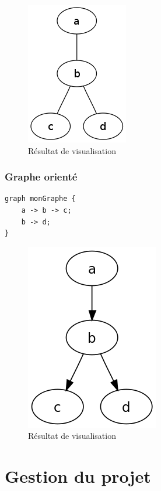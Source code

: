 \documentclass[12pt,a4paper]{report}
\begin{document}
\begin{figure}[!h]
  \centering
  \includegraphics[scale=0.3]{ressources/grapheNO.png}
  \caption{Résultat de visualisation}
\end{figure}

\subsection{Graphe orienté}

\begin{lstlisting}[caption=Description textuelle en DOT]
graph monGraphe {
    a -> b -> c;
    b -> d;
}
\end{lstlisting}

\begin{figure}[H]
  \centering
  \includegraphics[scale=0.3]{ressources/grapheO.png}
  \caption{Résultat de visualisation}
\end{figure}

\chapter{Gestion du projet}
\end{document}
